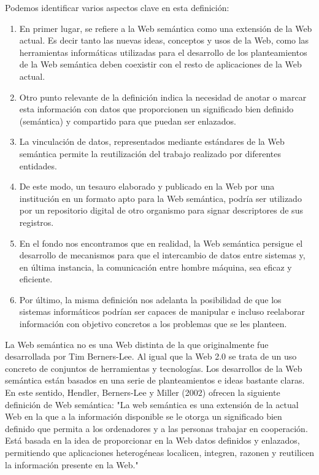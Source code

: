 Podemos identificar varios aspectos clave en esta definición:
\begin{enumerate}
	\item En primer lugar, se refiere a la Web semántica como una extensión de la Web actual. Es decir tanto las nuevas ideas, conceptos y usos de la Web, como las herramientas informáticas utilizadas para el desarrollo de los planteamientos de la Web semántica deben coexistir con el resto de aplicaciones de la Web actual.
	
	\item Otro punto relevante de la definición indica la necesidad de anotar o marcar esta información con datos que proporcionen un significado bien definido (semántica) y compartido para que puedan ser enlazados.
	
	\item La vinculación de datos, representados mediante estándares de la Web semántica permite la reutilización del trabajo realizado por diferentes entidades.
	
	\item De este modo, un tesauro elaborado y publicado en la Web por una institución en un formato apto para la Web semántica, podría ser utilizado por un repositorio digital de otro organismo para signar descriptores de sus registros.
	
	\item En el fondo nos encontramos que en realidad, la Web semántica persigue el desarrollo de mecanismos para que el intercambio de datos entre sistemas y, en última instancia, la comunicación entre hombre máquina, sea eficaz y eficiente.
	
	\item Por último, la misma definición nos adelanta la posibilidad de que los sistemas informáticos podrían ser capaces de manipular e incluso reelaborar información con objetivo concretos a los problemas que se les planteen.
\end{enumerate}

La Web semántica no es una Web distinta de la que originalmente fue desarrollada por Tim Berners-Lee. Al igual que la Web 2.0 se trata de un uso concreto de conjuntos de herramientas y tecnologías. Los desarrollos de la Web semántica están basados en una serie de planteamientos e ideas bastante claras. En este sentido, Hendler, Berners-Lee y Miller (2002) ofrecen la siguiente definición de Web semántica: "La web semántica es una extensión de la actual Web en la que a la información disponible se le otorga un significado bien definido que permita a los ordenadores y a las personas trabajar en cooperación. Está basada en la idea de proporcionar en la Web datos definidos y enlazados, permitiendo que aplicaciones heterogéneas localicen, integren, razonen y reutilicen la información presente en la Web."

